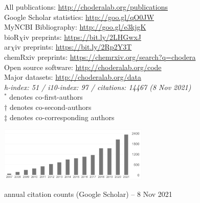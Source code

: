 \documentclass[10pt]{article}
\begin{document}
\begin{minipage}[t]{3.2in}
All publications: \href{http://choderalab.org/publications}{http://choderalab.org/publications} \\
Google Scholar statistics: \href{http://goo.gl/qO0JW}{http://goo.gl/qO0JW} \hspace{0.2in} \\
MyNCBI Bibliography: \href{http://goo.gl/e3kjgK}{http://goo.gl/e3kjgK} \\
bioR$\chi$iv preprints: \href{https://bit.ly/2LHGwxJ}{https://bit.ly/2LHGwxJ} \\
ar$\chi$iv preprints: \href{https://bit.ly/2Rp2Y3T}{https://bit.ly/2Rp2Y3T} \\
chemRxiv preprints: \href{https://chemrxiv.org/search?q=chodera}{https://chemrxiv.org/search?q=chodera} \\
Open source software: \href{http://choderalab.org/code}{http://choderalab.org/code}\\
Major datasets: \href{http://choderalab.org/data}{http://choderalab.org/data} \\
{\small \it h-index: 51 / i10-index: 97 / citations: 14467 (8 Nov 2021)} \\
{\scriptsize $^*$ denotes co-first-authors \\
$\dag$ denotes co-second-authors \\
$\ddag$ denotes co-corresponding authors}
\end{minipage}
\quad
\begin{minipage}[t]{3in}

\includegraphics[width=2.8in,valign=t]{thumbnails/citations-2021-11-08.pdf}

\vspace{0.05in}
{\small annual citation counts (Google Scholar) -- 8 Nov 2021}
\end{minipage}



\end{document}
